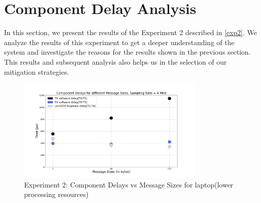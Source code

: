 



\section{Component Delay Analysis}
In this section, we present the results of the Experiment 2 described in \ref{exp2}.
We analyze the results of this experiment to get a deeper understanding of the system and investigate the reasons for the results shown in the previous section.
This results and subsequent analysis also helps us in the selection of our mitigation strategies.\\

\begin{figure}[h!]
\centering
\includegraphics[width=0.8\textwidth]{Thesis/Figure/E2_M1.png}
\caption{Experiment 2: Component Delays vs Message Sizes for laptop(lower processing resources)}
\label{e2_m1}
\end{figure}

